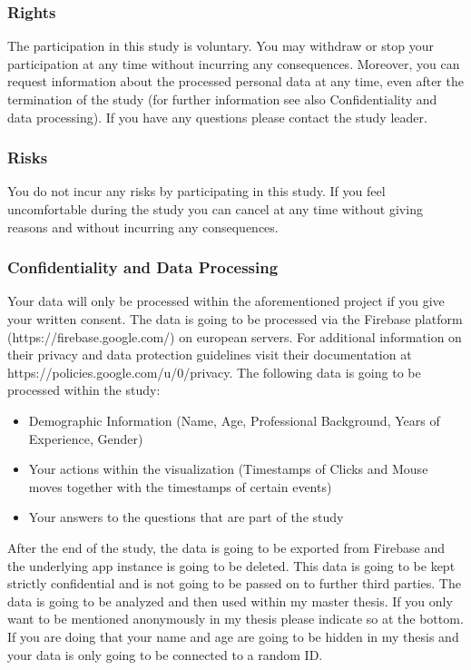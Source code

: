 \begin{appendices}
  \subsubsection*{Rights}

  The participation in this study is voluntary. You may withdraw or stop your participation at any time without incurring any consequences. Moreover, you can request information about the processed personal data at any time, even after the termination of the study (for further information see also Confidentiality and data processing). If you have any questions please contact the study leader.

  \subsubsection*{Risks}

  You do not incur any risks by participating in this study. If you feel uncomfortable during the study you can cancel at any time without giving reasons and without incurring any consequences.

  \subsubsection*{Confidentiality and Data Processing}

  Your data will only be processed within the aforementioned project if you give your written consent. The data is going to be processed via the Firebase platform (https://firebase.google.com/) on european servers. For additional information on their privacy and data protection guidelines visit their documentation at https://policies.google.com/u/0/privacy. The following data is going to be processed within the study:

  \begin{itemize}
    \item{Demographic Information (Name, Age, Professional Background, Years of Experience, Gender)}
    \item{Your actions within the visualization (Timestamps of Clicks and Mouse moves together with the timestamps of certain events)}
    \item{Your answers to the questions that are part of the study}
  \end{itemize}

  After the end of the study, the data is going to be exported from Firebase and the underlying app instance is going to be deleted. This data is going to be kept strictly confidential and is not going to be passed on to further third parties. The data is going to be analyzed and then used within my master thesis. If you only want to be mentioned anonymously in my thesis please indicate so at the bottom. If you are doing that your name and age are going to be hidden in my thesis and your data is only going to be connected to a random ID.


\end{appendices}
